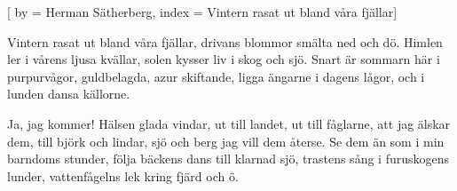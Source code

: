 [
by = {Herman Sätherberg},
index = {Vintern rasat ut bland våra fjällar}]

\beginverse* Vintern rasat ut bland våra fjällar,
drivans blommor smälta ned och dö.
Himlen ler i vårens ljusa kvällar,
solen kysser liv i skog och sjö.
Snart är sommarn här i purpurvågor,
guldbelagda, azur skiftande,
ligga ängarne i dagens lågor,
och i lunden dansa källorne.
\endverse

\beginverse* Ja, jag kommer! Hälsen glada vindar,
ut till landet, ut till fåglarne,
att jag älskar dem, till björk och lindar,
sjö och berg jag vill dem återse.
Se dem än som i min barndoms stunder,
följa bäckens dans till klarnad sjö,
trastens sång i furuskogens lunder,
vattenfågelns lek kring fjärd och ö.
\endverse
\endsong



